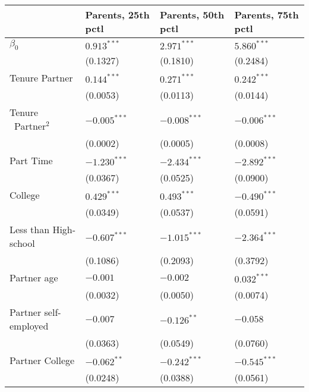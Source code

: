 \begin{tabular}{llll}
\toprule
{} & Parents, 25th pctl & Parents, 50th pctl & Parents, 75th pctl \\
\midrule
$\beta_0$                     &      $0.913^{***}$ &      $2.971^{***}$ &      $5.860^{***}$ \\
                              &           (0.1327) &           (0.1810) &           (0.2484) \\
Tenure Partner                &      $0.144^{***}$ &      $0.271^{***}$ &      $0.242^{***}$ \\
                              &           (0.0053) &           (0.0113) &           (0.0144) \\
Tenure \ Partner$^{2}$        &     $-0.005^{***}$ &     $-0.008^{***}$ &     $-0.006^{***}$ \\
                              &           (0.0002) &           (0.0005) &           (0.0008) \\
Part Time                     &     $-1.230^{***}$ &     $-2.434^{***}$ &     $-2.892^{***}$ \\
                              &           (0.0367) &           (0.0525) &           (0.0900) \\
College                       &      $0.429^{***}$ &      $0.493^{***}$ &     $-0.490^{***}$ \\
                              &           (0.0349) &           (0.0537) &           (0.0591) \\
Less than High-school         &     $-0.607^{***}$ &     $-1.015^{***}$ &     $-2.364^{***}$ \\
                              &           (0.1086) &           (0.2093) &           (0.3792) \\
Partner age                   &           $-0.001$ &           $-0.002$ &      $0.032^{***}$ \\
                              &           (0.0032) &           (0.0050) &           (0.0074) \\
Partner self-employed         &           $-0.007$ &      $-0.126^{**}$ &           $-0.058$ \\
                              &           (0.0363) &           (0.0549) &           (0.0760) \\
Partner College               &      $-0.062^{**}$ &     $-0.242^{***}$ &     $-0.545^{***}$ \\
                              &           (0.0248) &           (0.0388) &           (0.0561) \\

\end{tabular}
